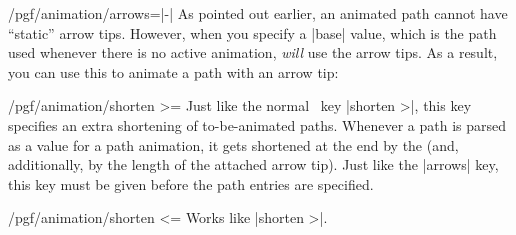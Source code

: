 \begin{key}{/pgf/animation/arrows=|-|}
    As pointed out earlier, an animated path cannot have ``static'' arrow tips.
    However, when you specify a |base| value, which is the path used whenever
    there is no active animation, \emph{will} use the arrow tips. As a result,
    you can use this to animate a path with an arrow tip:
\begin{codeexample}[animation list={0,1,2,3,4},animation bb={(0.9,-0.1)rectangle(2.1,1.1)}]
\end{codeexample}
\end{key}

\begin{key}{/pgf/animation/shorten >=}
    Just like the normal \tikzname\ key |shorten >|, this key specifies an
    extra shortening of to-be-animated paths. Whenever a path is parsed as a
    value for a path animation, it gets shortened at the end by the
     (and, additionally, by the length of the attached arrow
    tip). Just like the |arrows| key, this key must be given before the path
    entries are specified.
\begin{codeexample}[animation list={0,1,2,3,4},animation bb={(0.9,-0.1)rectangle(2.1,1.1)}]
\end{codeexample}
\end{key}

\begin{key}{/pgf/animation/shorten <=}
    Works like |shorten >|.
\end{key}


